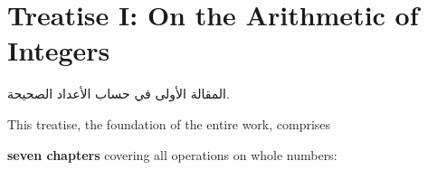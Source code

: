 \documentclass[11pt,a4paper]{article}
\newenvironment{arabicbox}{%

  \begin{framed}

  \begin{minipage}{\linewidth-2\fboxsep-2\fboxrule}

  \setlength{\parindent}{0pt}

  \linespread{1.3}\selectfont

}{%

  \end{minipage}

  \end{framed}

}
\begin{document}
\clearpage








\section{Treatise I: On the Arithmetic of Integers}

\label{sec:treatise1}



\begin{arabicbox}

\begin{Arabic}

المقالة الأولى في حساب الأعداد الصحيحة.

\end{Arabic}

\end{arabicbox}



\vspace{0.3cm}



\noindent This treatise, the foundation of the entire work, comprises

\textbf{seven chapters} covering all operations on whole numbers:
\end{document}
